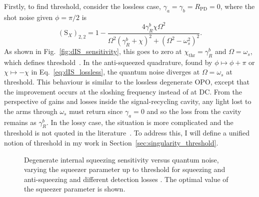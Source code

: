 Firstly, to find threshold, consider the lossless case, $\gamma_a=\gamma_b=R_\text{PD}=0$, where the shot noise given $\phi=\pi/2$ is 
\begin{equation}
\label{eq:dIS_lossless}
(\text{S}_X)_{2,2}=1-\frac{4 \gamma^b_R \chi \Omega ^2}{\Omega ^2 (\gamma^b_R+\chi )^2+(\Omega ^2-\omega_s^2)^2}.
\end{equation}
As shown in Fig.~\ref{fig:dIS_sensitivity}, this goes to zero at $\chi_\text{thr}=\gamma^b_R$ and $\Omega=\omega_s$, which defines threshold~\cite{}. In the anti-squeezed quadrature, found by $\phi\mapsto\phi+\pi$ or $\chi\mapsto-\chi$ in Eq.~\ref{eq:dIS_lossless}, the quantum noise diverges at $\Omega=\omega_s$ at threshold. This behaviour is similar to the lossless degenerate OPO, except that the improvement occurs at the sloshing frequency instead of at DC. From the perspective of gains and losses inside the signal-recycling cavity, any light lost to the arms through $\omega_s$ must return since $\gamma_a=0$ and so the loss from the cavity remains as $\gamma^b_R$. In the lossy case, the situation is more complicated and the threshold is not quoted in the literature~\cite{}. To address this, I will define a unified notion of threshold in my work in Section~\ref{sec:singularity_threshold}. 

\begin{figure}
	\centering
	\caption{Degenerate internal squeezing sensitivity versus quantum noise, varying the squeezer parameter up to threshold for squeezing and anti-squeezing and different detection losses . The optimal value of the squeezer parameter is shown.}
	\label{fig:dIS_optimal_squeezing}
\end{figure}

